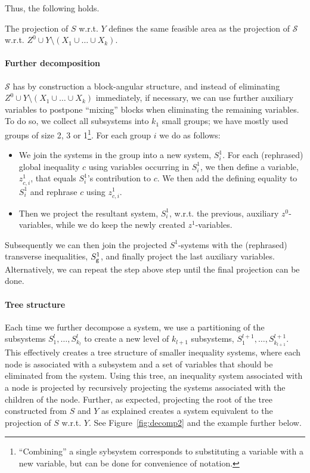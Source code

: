 Thus, the following holds. 
\begin{prop}
The projection of $S$ w.r.t. $Y$ defines the same feasible area as 
the projection of $\mathcal{S}$ w.r.t. $Z^0 \cup Y\setminus (X_1\cup \ldots \cup X_k)$.
\end{prop}

\paragraph{Further decomposition}
$\mathcal{S}$ has by construction a block-angular structure, and instead of eliminating $Z^0\cup Y\setminus(X_1\cup\ldots\cup X_k)$ immediately, if necessary, we can use further auxiliary variables to postpone ``mixing'' blocks when eliminating the remaining variables. 
To do so, we collect all subsystems into $k_1$ small groups; we have mostly used groups of size 2, 3 or 1\footnote{``Combining'' a single sybsystem corresponds to substituting a variable with a new variable, but can be done for convenience of notation.}.
For each group $i$ we do as follows:
\begin{itemize}\itemsep0em
\item We join the systems in the group into a new system, $S^1_i$. For each (rephrased) global inequality $c$ using variables occurring in $S^1_i$, we then define a variable, $z^1_{c,i}$, that equals $S^1_i$'s contribution to $c$. We then add the defining equality to $S^1_i$ and rephrase $c$ using $z^1_{c,i}$.

\item Then we project the resultant system, $S^1_i$, w.r.t. the previous, auxiliary $z^0$-variables, while we do keep the newly created $z^1$-variables.
\end{itemize} 
Subsequently we can then join the projected $S^1$-systems with the (rephrased) transverse inequalities, $S_{\texttt{g}}^1$, and finally project the last auxiliary variables. Alternatively, we can repeat the step above step until the final projection can be done. 

\paragraph{Tree structure}
Each time we further decompose a system, we use a partitioning of the subsystems $S^l_1, \ldots, S^l_{k_l}$ to create a new level of $k_{l+1}$ subsystems, $S^{l+1}_1,\ldots, S^{l+1}_{k_{l+1}}$. This effectively creates a tree structure of smaller inequality systems, where each node is associated with a subsystem and a set of variables that should be eliminated from the system. 
Using this tree, an inequality system associated with a node is projected by recursively projecting the systems associated with the children of the node. Further, as expected, projecting the root of the tree constructed from $S$ and $Y$ as explained creates a system equivalent to the projection of $S$ w.r.t. $Y$. See Figure~\ref{fig:decomp2} and the example further below.

